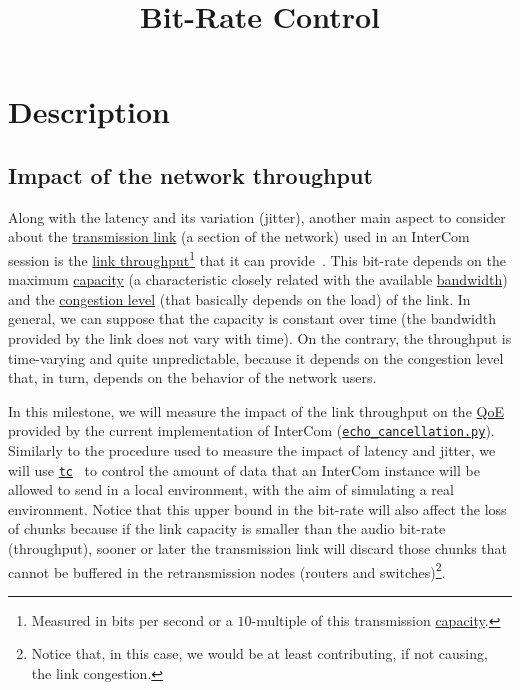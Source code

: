 
\title{Bit-Rate Control}


\maketitle

\tableofcontents

\section{Description}
\subsection{Impact of the network throughput}
Along with the latency and its variation (jitter), another main aspect
to consider about the
\href{https://en.wikipedia.org/wiki/Telecommunications_link}{transmission
  link} (a section of the network) used in an InterCom session is the
\href{https://en.wikipedia.org/wiki/Channel_capacityhttps://en.wikipedia.org/wiki/Network_throughput}{link
  throughput}\footnote{Measured in bits per second or a $10$-multiple
  of this transmission
  \href{https://en.wikipedia.org/wiki/Bandwidth_(computing)}{capacity}.}
that it can provide~\cite{Forouzan,Tanenbaum}. This bit-rate depends on
the maximum
\href{https://en.wikipedia.org/wiki/Channel_capacity}{capacity} (a
characteristic closely related with the available
\href{https://en.wikipedia.org/wiki/Bandwidth_(signal_processing)}{bandwidth})
and the
\href{https://en.wikipedia.org/wiki/Network_congestion}{congestion
  level} (that basically depends on the load) of the link. In general,
we can suppose that the capacity is constant over time (the
bandwidth provided by the link does not vary with time). On the
contrary, the throughput is time-varying and quite unpredictable,
because it depends on the congestion level that, in turn, depends
on the behavior of the network users.

In this milestone, we will measure the impact of the link throughput
on the \href{https://en.wikipedia.org/wiki/Quality_of_experience}{QoE}
provided by the current implementation of InterCom
(\href{https://github.com/Tecnologias-multimedia/InterCom/blob/master/src/echo_cancellation.py}{\texttt{echo\_cancellation.py}}). Similarly
to the procedure used to measure the impact of latency and jitter, we
will use
\href{https://man7.org/linux/man-pages/man8/tc.8.html}{\texttt{tc}}~\cite{bert2012lartc}
to control the amount of data that an InterCom instance will be
allowed to send in a local environment, with the aim of simulating a
real environment. Notice that this upper bound in the bit-rate will
also affect the loss of chunks because if the link capacity is smaller
than the audio bit-rate (throughput), sooner or later the transmission
link will discard those chunks that cannot be buffered in the
retransmission nodes (routers and switches)\footnote{Notice that, in
  this case, we would be at least contributing, if not causing, the
  link congestion.}.

